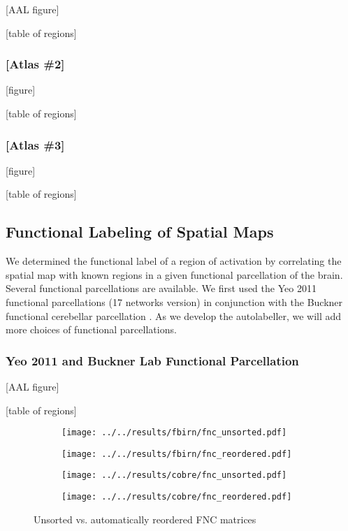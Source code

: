 \documentclass{article}
\begin{document}
[AAL figure]

[table of regions]

\subsubsection{[Atlas \#2]}

[figure]

[table of regions]

\subsubsection{[Atlas \#3]}

[figure]

[table of regions]


\subsection{Functional Labeling of Spatial Maps}

We determined the functional label of a region of activation by correlating the spatial map with known regions in a given functional parcellation of the brain.
Several functional parcellations are available.
We first used the Yeo 2011 functional parcellations (17 networks version) in conjunction with the Buckner functional cerebellar parcellation \citep{b3,b4}.
As we develop the autolabeller, we will add more choices of functional parcellations.

\subsubsection{Yeo 2011 and Buckner Lab Functional Parcellation}

[AAL figure]

[table of regions]

\begin{figure}[ht]
    \begin{subfigure}[t]{0.49\textwidth}
        \centering
        \texttt{[image: ../../results/fbirn/fnc\_unsorted.pdf]}
    \end{subfigure}
    \hfill
    \begin{subfigure}[t]{0.49\textwidth}
        \centering
        \texttt{[image: ../../results/fbirn/fnc\_reordered.pdf]}
    \end{subfigure}
    \medskip
    \begin{subfigure}[t]{0.49\textwidth}
        \centering
        \texttt{[image: ../../results/cobre/fnc\_unsorted.pdf]}
    \end{subfigure}
    \hfill
    \begin{subfigure}[t]{0.49\textwidth}
        \centering
        \texttt{[image: ../../results/cobre/fnc\_reordered.pdf]}
    \end{subfigure}
    \caption{\label{fig:frog}Unsorted vs. automatically reordered \ac{FNC} matrices}
\end{figure}
\end{document}
